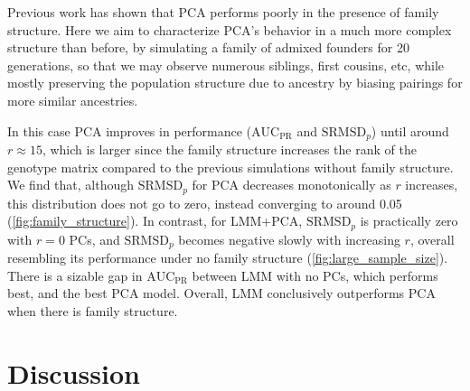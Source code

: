 \documentclass[11pt]{article}
\newcommand{\rmsd}{\text{SRMSD}_p}
\newcommand{\auc}{\text{AUC}_\text{PR}}
\begin{document}
Previous work has shown that PCA performs poorly in the presence of family structure.
Here we aim to characterize PCA's behavior in a much more complex structure than before, by simulating a family of admixed founders for 20 generations, so that we may observe numerous siblings, first cousins, etc, while mostly preserving the population structure due to ancestry by biasing pairings for more similar ancestries.

In this case PCA improves in performance ($\auc$ and $\rmsd$) until around $r \approx 15$, which is larger since the family structure increases the rank of the genotype matrix compared to the previous simulations without family structure.
We find that, although $\rmsd$ for PCA decreases monotonically as $r$ increases, this distribution does not go to zero, instead converging to around 0.05 (\cref{fig:family_structure}).
In contrast, for LMM+PCA, $\rmsd$ is practically zero with $r=0$ PCs, and $\rmsd$ becomes negative slowly with increasing $r$, overall resembling its performance under no family structure (\cref{fig:large_sample_size}).
There is a sizable gap in $\auc$ between LMM with no PCs, which performs best, and the best PCA model.
Overall, LMM conclusively outperforms PCA when there is family structure.

\section{Discussion}




\end{document}
